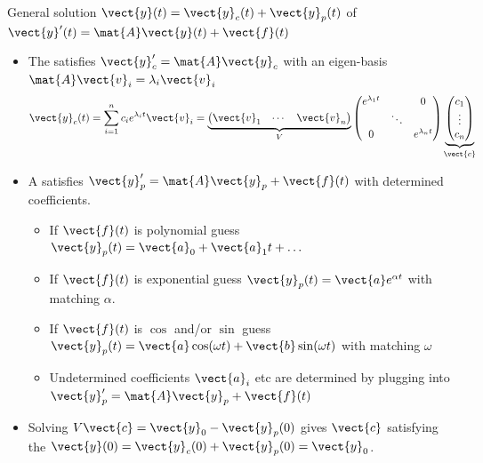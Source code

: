 \begin{frame}{General solution 
		$\vect{y}(t)=\vect{y}_c(t)+\vect{y}_p(t)$ of
		$\vect{y}'(t)=\mat{A}\vect{y}(t) + \vect{f}(t)$}
\setlength{\abovedisplayskip}{4pt}
\setlength{\belowdisplayskip}{4pt}
\setlength{\abovedisplayshortskip}{2pt}
\setlength{\belowdisplayshortskip}{2pt}
\begin{itemize}
\setlength{\itemsep}{2pt}
  \item The  satisfies
  $\vect{y}_c'=\mat{A}\vect{y}_c$ with an eigen-basis
  $\mat{A}\vect{v}_i=\lambda_i\vect{v}_i$
  \[
  \vect{y}_c(t)=\sum_{i=1}^n c_i e^{\lambda_i t}\vect{v}_i=\underbrace{\begin{pmatrix}\vect{v}_1&\cdots&\vect{v}_n\end{pmatrix}}_{V}\begin{pmatrix}e^{\lambda_1 t}& &0\\ &\ddots& \\0& &e^{\lambda_n t}\end{pmatrix}\underbrace{\begin{pmatrix}c_1\\\vdots\\c_n\end{pmatrix}}_{\vect{c}}
  \]
  \item 
  A  satisfies
  $\vect{y}_p'=\mat{A}\vect{y}_p+\vect{f}(t)$
  with determined coefficients.
  \begin{itemize}
  \setlength{\itemsep}{1pt}
    \item If $\vect{f}(t)$ is polynomial guess
    $\vect{y}_p(t)=\vect{a}_0+\vect{a}_1t+\dots$
    \item If $\vect{f}(t)$ is exponential guess $\vect{y}_p(t)=\vect{a}e^{\alpha t}$ with matching $\alpha$. 
    \item If $\vect{f}(t)$ is $\cos$ and/or $\sin $ guess
    $\vect{y}_p(t)=\vect{a}\cos(\omega t)+\vect{b}\sin(\omega t)$ with matching $\omega$
    \item Undetermined coefficients $\vect{a}_i$ etc are determined by plugging into $\vect{y}_p'=\mat{A}\vect{y}_p+\vect{f}(t)$
  \end{itemize}
  \item Solving $
  V\vect{c}=\vect{y}_0-\vect{y}_p(0)$  gives 
  $\vect{c}$ satisfying the  
  $\vect{y}(0) = \vect{y}_c(0)+\vect{y}_p(0)=\vect{y}_0$.
\end{itemize}
\end{frame}
